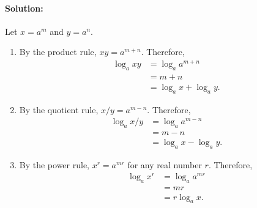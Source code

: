 \documentclass{article}
\begin{document}
\paragraph*{Solution:}	Let $x=a^{m}$ and $y=a^{n}$.
\begin{enumerate}
\item	By the product rule, $xy=a^{m+n}$. Therefore, 
\begin{align*}
\log_{a}xy&=\log_{a}a^{m+n} \\
&=m+n \\
&=\log_{a}x+\log_{a}y.
\end{align*}
\item	By the quotient rule, $x/y=a^{m-n}$. Therefore,
\begin{align*}
\log_{a}x/y&=\log_{a}a^{m-n} \\
&=m-n \\
&=\log_{a}x-\log_{a}y.
\end{align*}
\item	By the power rule, $x^{r}=a^{mr}$ for any real number $r$. Therefore,
\begin{align*}
\log_{a}x^{r}&=\log_{a}a^{mr} \\
&=mr \\
&=r\log_{a}x.
\end{align*}
\end{enumerate}
\end{document}
